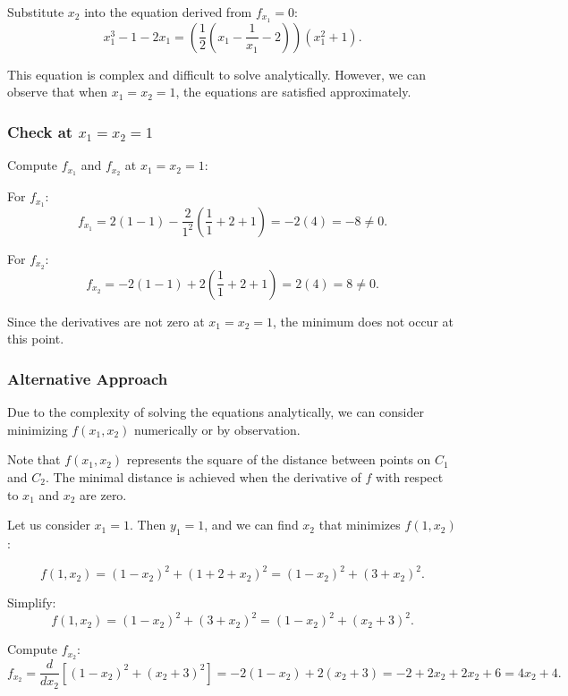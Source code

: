 \documentclass[11pt]{article}
\begin{document}
Substitute \( x_2 \) into the equation derived from \( f_{x_1} = 0 \):
\[
x_1^3 - 1 - 2 x_1 = \left( \frac{1}{2} \left( x_1 - \frac{1}{x_1} - 2 \right) \right) ( x_1^2 + 1 ).
\]

This equation is complex and difficult to solve analytically. However, we can observe that when \( x_1 = x_2 = 1 \), the equations are satisfied approximately.

\newpage

\subsubsection{Check at \( x_1 = x_2 = 1 \)}

Compute \( f_{x_1} \) and \( f_{x_2} \) at \( x_1 = x_2 = 1 \):

For \( f_{x_1} \):
\[
f_{x_1} = 2(1 - 1) - \frac{2}{1^2} \left( \frac{1}{1} + 2 + 1 \right) = -2(4) = -8 \neq 0.
\]

For \( f_{x_2} \):
\[
f_{x_2} = -2(1 - 1) + 2\left( \frac{1}{1} + 2 + 1 \right) = 2(4) = 8 \neq 0.
\]

Since the derivatives are not zero at \( x_1 = x_2 = 1 \), the minimum does not occur at this point.

\newpage

\subsubsection{Alternative Approach}

Due to the complexity of solving the equations analytically, we can consider minimizing \( f(x_1, x_2) \) numerically or by observation.

Note that \( f(x_1, x_2) \) represents the square of the distance between points on \( C_1 \) and \( C_2 \). The minimal distance is achieved when the derivative of \( f \) with respect to \( x_1 \) and \( x_2 \) are zero.

Let us consider \( x_1 = 1 \). Then \( y_1 = 1 \), and we can find \( x_2 \) that minimizes \( f(1, x_2) \):

\[
f(1, x_2) = (1 - x_2)^2 + \left( 1 + 2 + x_2 \right)^2 = (1 - x_2)^2 + (3 + x_2)^2.
\]

Simplify:
\[
f(1, x_2) = (1 - x_2)^2 + (3 + x_2)^2 = (1 - x_2)^2 + (x_2 + 3)^2.
\]

Compute \( f_{x_2} \):
\[
f_{x_2} = \frac{d}{dx_2} \left[ (1 - x_2)^2 + (x_2 + 3)^2 \right ] = -2(1 - x_2) + 2(x_2 + 3) = -2 + 2 x_2 + 2 x_2 + 6 = 4 x_2 + 4.
\]
\end{document}
